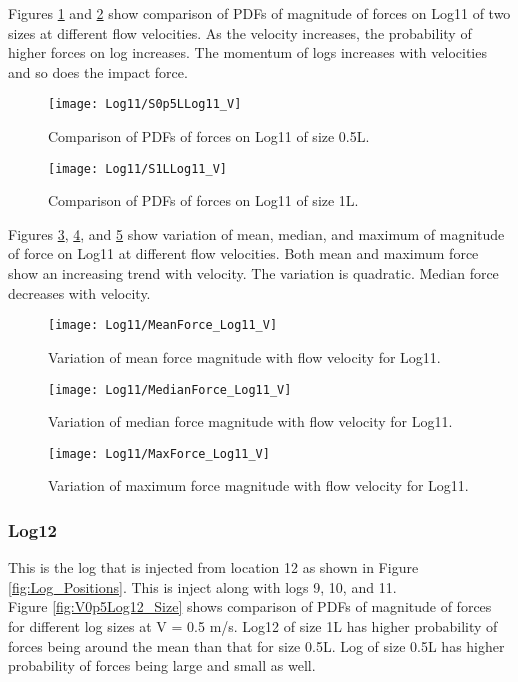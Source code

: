 \noindent Figures \ref{fig:S0p5LLog11_V} and \ref{fig:S1LLog11_V} show comparison of PDFs of magnitude of forces on Log11 of two sizes at different flow velocities. As the velocity increases, the probability of higher forces on log increases. The momentum of logs increases with velocities and so does the impact force.

\begin{figure}
\centering
\texttt{[image: Log11/S0p5LLog11\_V]}
\caption{\label{fig:S0p5LLog11_V}Comparison of PDFs of forces on Log11 of size 0.5L.}
\end{figure}
\begin{figure}
\centering
\texttt{[image: Log11/S1LLog11\_V]}
\caption{\label{fig:S1LLog11_V}Comparison of PDFs of forces on Log11 of size 1L.}
\end{figure}

\noindent Figures \ref{fig:MeanForce_Log11_V}, \ref{fig:MedianForce_Log11_V}, and \ref{fig:MaxForce_Log11_V} show variation of mean, median, and maximum of magnitude of force on Log11 at different flow velocities. Both mean and maximum force show an increasing trend with velocity. The variation is quadratic. Median force decreases with velocity.

\begin{figure}
\centering
\texttt{[image: Log11/MeanForce\_Log11\_V]}
\caption{\label{fig:MeanForce_Log11_V}Variation of mean force magnitude with flow velocity for Log11.}
\end{figure}
\begin{figure}
\centering
\texttt{[image: Log11/MedianForce\_Log11\_V]}
\caption{\label{fig:MedianForce_Log11_V}Variation of median force magnitude with flow velocity for Log11.}
\end{figure}
\begin{figure}
\centering
\texttt{[image: Log11/MaxForce\_Log11\_V]}
\caption{\label{fig:MaxForce_Log11_V}Variation of maximum force magnitude with flow velocity for Log11.}
\end{figure}

\FloatBarrier
\subsubsection{Log12}
This is the log that is injected from location 12 as shown in Figure \ref{fig:Log_Positions}. This is inject along with logs 9, 10, and 11.\\ 
Figure \ref{fig:V0p5Log12_Size} shows comparison of PDFs of magnitude of forces for different log sizes at V = 0.5 m/s. Log12 of size 1L has higher probability of forces being around the mean than that for size 0.5L. Log of size 0.5L has higher probability of forces being large and small as well.

